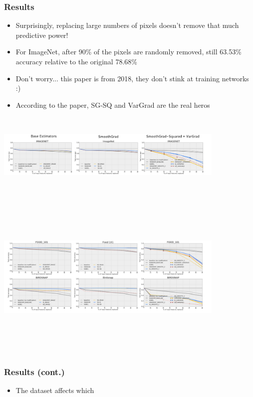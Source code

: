 \documentclass{beamer}
\theoremstyle{mystyle}
\begin{document}
\begin{frame}
	\frametitle{Results}
	\begin{itemize}
		\item Surprisingly, replacing large numbers of pixels doesn't remove that much predictive power! \pause
		\item For ImageNet, after 90\% of the pixels are randomly removed, still 63.53\% accuracy relative to the original 78.68\% \pause
		\item Don't worry... this paper is from 2018, they don't stink at training networks :)\pause
		\item According to the paper, SG-SQ and VarGrad are the real heros \pause
	\end{itemize} 
	\includegraphics[width=11cm, height=4cm]{ImgNetSG.png}

\end{frame}
\begin{frame}
	\includegraphics[width=11cm, height=8cm]{other2SG.png}
\end{frame}
\begin{frame}
	\frametitle{Results (cont.)}
	\begin{itemize}
	\item The dataset affects which 
	\end{itemize}
\end{frame}
\end{document}
